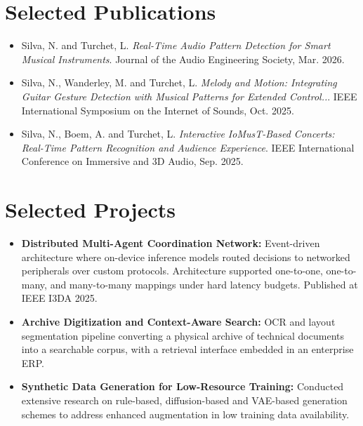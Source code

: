 \documentclass[11pt]{article}
\begin{document}
\section*{Selected Publications \footnotesize {}}
\begin{itemize}[leftmargin=1.2em, itemsep=-0.25em]
    \item Silva, N. and Turchet, L. \textit{Real-Time Audio Pattern Detection for Smart Musical Instruments}. Journal of the Audio Engineering Society, Mar. 2026. 
    \item Silva, N., Wanderley, M. and Turchet, L. \textit{Melody and Motion: Integrating Guitar Gesture Detection with Musical Patterns for Extended Control..}. IEEE International Symposium on the Internet of Sounds, Oct. 2025.
    \item Silva, N., Boem, A. and Turchet, L. \textit{Interactive IoMusT-Based Concerts: Real-Time Pattern Recognition and Audience Experience}. IEEE International Conference on Immersive and 3D Audio, Sep. 2025.
\end{itemize}

\section*{Selected Projects \footnotesize {}}
\begin{itemize}[leftmargin=1.2em, itemsep=-0.25em]
    \item \textbf{Distributed Multi-Agent Coordination Network:} Event-driven architecture where on-device inference models routed decisions to networked peripherals over custom protocols. Architecture supported one-to-one, one-to-many, and many-to-many mappings under hard latency budgets. Published at IEEE I3DA 2025.
    \item \textbf{Archive Digitization and Context-Aware Search:} OCR and layout segmentation pipeline converting a physical archive of technical documents into a searchable corpus, with a retrieval interface embedded in an enterprise ERP.
    \item \textbf{Synthetic Data Generation for Low-Resource Training:} Conducted extensive research on rule-based, diffusion-based and VAE-based generation schemes to address enhanced augmentation in low training data availability.
\end{itemize}
\end{document}
